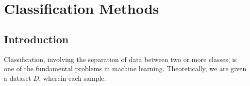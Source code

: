 \chapter{Classification Methods}
\label{chapter:Classification Methods}

\section{Introduction}
Classification, involving the separation of data between two or more classes, is one of the fundamental problems in machine learning. Theoretically, we are given a dataset $D$, wherein each sample.
